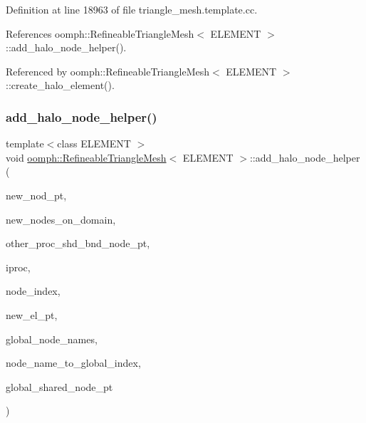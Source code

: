 Definition at line 18963 of file triangle\+\_\+mesh.\+template.\+cc.



References oomph\+::\+Refineable\+Triangle\+Mesh$<$ E\+L\+E\+M\+E\+N\+T $>$\+::add\+\_\+halo\+\_\+node\+\_\+helper().



Referenced by oomph\+::\+Refineable\+Triangle\+Mesh$<$ E\+L\+E\+M\+E\+N\+T $>$\+::create\+\_\+halo\+\_\+element().

\mbox{\label{classoomph_1_1RefineableTriangleMesh_a1ea169baf7b9d85c2f3334ea5dd3199a}} 
\subsubsection{\texorpdfstring{add\+\_\+halo\+\_\+node\+\_\+helper()}{add\_halo\_node\_helper()}}
{\footnotesize\ttfamily template$<$class E\+L\+E\+M\+E\+NT $>$ \\
void \hyperlink{classoomph_1_1RefineableTriangleMesh}{oomph\+::\+Refineable\+Triangle\+Mesh}$<$ E\+L\+E\+M\+E\+NT $>$\+::add\+\_\+halo\+\_\+node\+\_\+helper (\begin{DoxyParamCaption}\item[{Node $\ast$\&}]{new\+\_\+nod\+\_\+pt,  }\item[{Vector$<$ Node $\ast$$>$ \&}]{new\+\_\+nodes\+\_\+on\+\_\+domain,  }\item[{Vector$<$ Vector$<$ Vector$<$ std\+::map$<$ unsigned, Node $\ast$$>$ $>$ $>$ $>$ \&}]{other\+\_\+proc\+\_\+shd\+\_\+bnd\+\_\+node\+\_\+pt,  }\item[{unsigned \&}]{iproc,  }\item[{unsigned \&}]{node\+\_\+index,  }\item[{Finite\+Element $\ast$const \&}]{new\+\_\+el\+\_\+pt,  }\item[{Vector$<$ Vector$<$ Vector$<$ unsigned $>$ $>$ $>$ \&}]{global\+\_\+node\+\_\+names,  }\item[{std\+::map$<$ Vector$<$ unsigned $>$, unsigned $>$ \&}]{node\+\_\+name\+\_\+to\+\_\+global\+\_\+index,  }\item[{Vector$<$ Node $\ast$$>$ \&}]{global\+\_\+shared\+\_\+node\+\_\+pt }\end{DoxyParamCaption})\hspace{0.3cm}{\ttfamily [protected]}}



